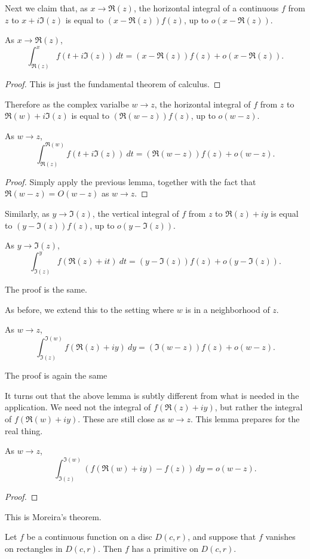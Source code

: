 Next we claim that, as $x \to \Re(z)$, the horizontal integral of a continuous $f$
from $z$ to $x + i\Im(z)$ is equal to $(x - \Re(z)) f(z)$, up to $o(x - \Re(z))$.
\begin{lemma}
  \label{deriv_of_wedgeInt_re'}
  \leanok
  As $x \to \Re(z)$,
  $$
    \int_{\Re(z)}^x f(t + i\Im(z))\ dt
    =
    (x-\Re(z)) f(z)
    +
    o(x-\Re(z))
    .
  $$
\end{lemma}

 \begin{proof}
 This is just the fundamental theorem of calculus.
 \end{proof}

Therefore as the complex varialbe $w \to z$, the horizontal integral of $f$ from $z$ to
$\Re(w)+i\Im(z)$ is equal to $(\Re(w - z)) f(z)$, up to $o(w - z)$.
\begin{lemma}
  \label{deriv_of_wedgeInt_re}
  \leanok
  As $w \to z$,
  $$
    \int_{\Re(z)}^{\Re(w)} f(t + i\Im(z))\ dt
    =
    (\Re(w-z)) f(z)
    +
    o(w-z)
    .
  $$
\end{lemma}

 \begin{proof}
 Simply apply the previous lemma, together with the fact that $\Re(w - z) = O(w - z)$ as $w \to z$.
 \end{proof}

Similarly, as $y \to \Im(z)$, the vertical integral of $f$ from $z$ to $\Re(z)+iy$ is equal to
$(y - \Im(z)) f(z)$, up to $o(y - \Im(z))$.
\begin{lemma}
  \label{deriv_of_wedgeInt_im'}
  \leanok
  As $y \to \Im(z)$,
  $$
    \int_{\Im(z)}^y f(\Re(z)+it)\ dt
    =
    (y-\Im(z)) f(z)
    +
    o(y-\Im(z))
    .
  $$
\end{lemma}
The proof is the same.


As before, we extend this to the setting where $w$ is in a neighborhood of $z$.
\begin{lemma}
  \label{deriv_of_wedgeInt_im''}
  \leanok
  As $w \to z$,
  $$
    \int_{\Im(z)}^{\Im(w)} f(\Re(z)+iy)\ dy
    =
    (\Im(w-z)) f(z)
    +
    o(w-z)
    .
  $$
\end{lemma}
The proof is again the same


It turns out that the above lemma is subtly different from what is needed in the application.
We need not the integral of $f(\Re(z)+iy)$, but rather the integral of $f(\Re(w)+iy)$. These are
still close as $w \to z$. This lemma prepares for the real thing.
\begin{lemma}
  \label{deriv_of_wedgeInt_im'''}
  As $w \to z$,
  $$
    \int_{\Im(z)}^{\Im(w)} (f(\Re(w)+iy) - f (z))\ dy
    =
    o(w-z)
    .
  $$
\end{lemma}

 \begin{proof}
 \end{proof}

This is Moreira's theorem.
\begin {theorem}
\label {moreira}
\leanok
Let $f$ be a continuous function on a disc $D(c,r)$, and suppose that $f$ vanishes on rectangles in $D(c,r)$. Then $f$ has a primitive on $D(c,r)$.
\end {theorem}

